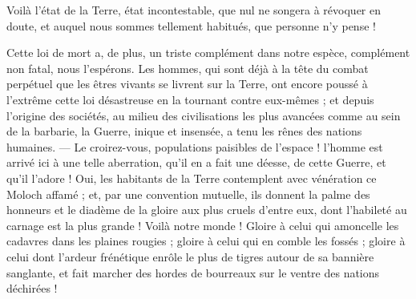\documentclass[a4paper, 11pt, oneside, landscape]{article}
\begin{document}
Voilà l'état de la Terre, état incontestable, que nul ne songera à révoquer en doute, et auquel nous sommes tellement habitués, que personne n'y pense !

Cette loi de mort a, de plus, un triste complément dans notre espèce, complément non fatal, nous l'espérons. Les hommes, qui sont déjà à la tête du combat perpétuel que les êtres vivants se livrent sur la Terre, ont encore poussé à l'extrême cette loi désastreuse en la tournant contre eux-mêmes ; et depuis l'origine des sociétés, au milieu des civilisations les plus avancées comme au sein de la barbarie, la Guerre, inique et insensée, a tenu les rênes des nations humaines. --- Le croirez-vous, populations paisibles de l'espace ! l'homme est arrivé ici à une telle aberration, qu'il en a fait une déesse, de cette Guerre, et qu'il l'adore ! Oui, les habitants de la Terre contemplent avec vénération ce Moloch affamé ; et, par une convention mutuelle, ils donnent la palme des honneurs et le diadème de la gloire aux plus cruels d'entre eux, dont l'habileté au carnage est la plus grande ! Voilà notre monde ! Gloire à celui qui amoncelle les cadavres dans les plaines rougies ; gloire à celui qui en comble les fossés ; gloire à celui dont l'ardeur frénétique enrôle le plus de tigres autour de sa bannière sanglante, et fait marcher des hordes de bourreaux sur le ventre des nations déchirées !
\end{document}

